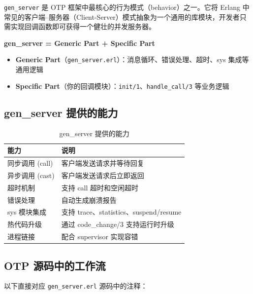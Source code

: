 \documentclass[a4paper,11pt]{article}
\begin{document}
\texttt{gen\_server} 是 OTP 框架中最核心的行为模式（behavior）之一。它将 Erlang 中常见的客户端--服务器（Client-Server）模式抽象为一个通用的库模块，开发者只需实现回调函数即可获得一个健壮的并发服务器。

\begin{tipbox}[核心思想]
\textbf{gen\_server = Generic Part + Specific Part}

\begin{itemize}[leftmargin=1.5em]
    \item \textbf{Generic Part}（\texttt{gen\_server.erl}）：消息循环、错误处理、超时、sys 集成等通用逻辑
    \item \textbf{Specific Part}（你的回调模块）：\texttt{init/1}、\texttt{handle\_call/3} 等业务逻辑
\end{itemize}
\end{tipbox}

\subsection{gen\_server 提供的能力}

\begin{table}[H]
\centering
\begin{tabular}{@{}ll@{}}
\toprule
\textbf{能力} & \textbf{说明} \\
\midrule
同步调用 (call)    & 客户端发送请求并等待回复 \\
异步调用 (cast)    & 客户端发送请求后立即返回 \\
超时机制           & 支持 call 超时和空闲超时 \\
错误处理           & 自动生成崩溃报告 \\
sys 模块集成       & 支持 trace、statistics、suspend/resume \\
热代码升级         & 通过 code\_change/3 支持运行时升级 \\
进程链接           & 配合 supervisor 实现容错 \\
\bottomrule
\end{tabular}
\caption{gen\_server 提供的能力}
\end{table}

\subsection{OTP 源码中的工作流}

以下直接对应 \texttt{gen\_server.erl} 源码中的注释：
\end{document}
